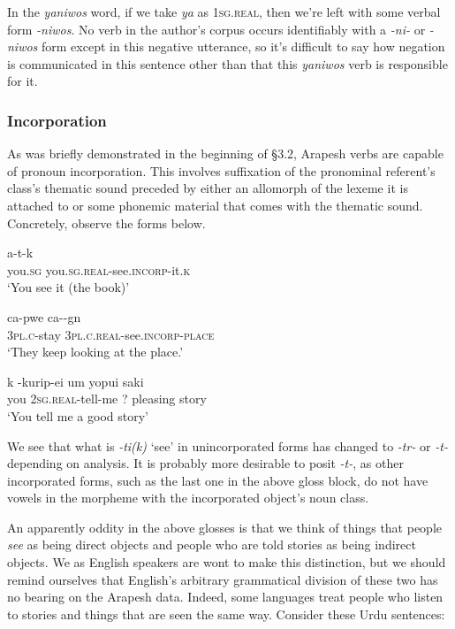 \documentclass[pdftex,12pt,letterpaper]{article}
\let\ipa\textipa
\let\enya\textltailn
\def\sw{\ipa{\super w}}
\begin{document}
In the \emph{yaniwos} word, if we take \emph{ya} as \textsc{1sg.real}, then we're left with some verbal form \emph{-niwos}. No verb in the author's corpus occurs identifiably with a \emph{-ni-} or \emph{-niwos} form except in this negative utterance, so it's difficult to say how negation is communicated in this sentence other than that this \emph{yaniwos} verb is responsible for it.

\subsubsection{Incorporation}

As was briefly demonstrated in the beginning of \S 3.2, Arapesh verbs are capable of pronoun incorporation. This involves suffixation of the pronominal referent's class's thematic sound preceded by either an allomorph of the lexeme it is attached to or some phonemic material that comes with the thematic sound. Concretely, observe the forms below.

\begin{exe}
\ex 
\gll \ipa{\enya@} \ipa{\enya}a-t\ipa{1r1}-k\sw \\
you.\textsc{sg} you.\textsc{sg.real}-see.\textsc{incorp}-it.\textsc{k\sw} \\
\trans `You see it (the book)'

 \ex
 \gll ca-pwe ca-\ipa{t1r1}-g\ipa{1}n \\
 \textsc{3pl.c}-stay \textsc{3pl.c.real}-see.\textsc{incorp}-\textsc{place} \\
 \trans `They keep looking at the place.'
 
 \ex
 \gll \ipa{\enya@}k \ipa{\enya@}-kurip-ei um yopu\ipa{\enya}i saki \\
 you \textsc{2sg.real}-tell-me ? pleasing story \\
 \trans `You tell me a good story'
\end{exe}

\noindent We see that what is \emph{-ti(k)} `see' in unincorporated forms has changed to \emph{-t\ipa{1}r-} or \emph{-t\ipa{1r1}-} depending on analysis. It is probably more desirable to posit \emph{-t\ipa{1r1}-}, as other incorporated forms, such as the last one in the above gloss block, do not have vowels in the morpheme with the incorporated object's noun class.

An apparently oddity in the above glosses is that we think of things that people \emph{see} as being direct objects and people who are told stories as being indirect objects. We as English speakers are wont to make this distinction, but we should remind ourselves that English's arbitrary grammatical division of these two has no bearing on the Arapesh data. Indeed, some languages treat people who listen to stories and things that are seen the same way. Consider these Urdu sentences:
\end{document}
